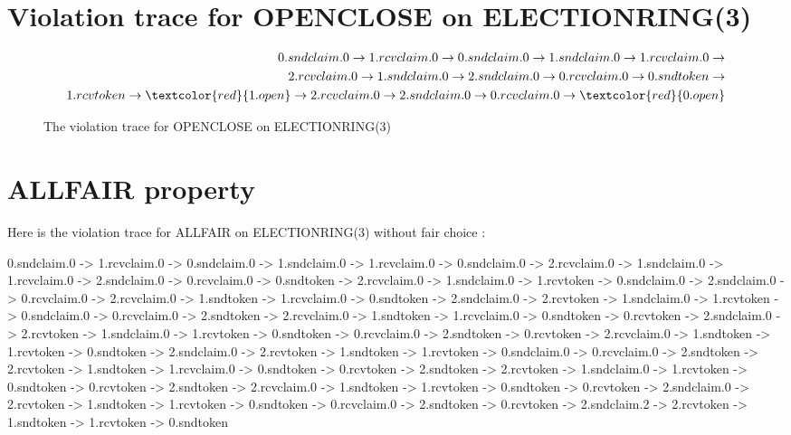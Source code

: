 \documentclass{article}
\begin{document}
\section{Violation trace for OPENCLOSE on ELECTIONRING(3)}

\begin{figure}[h!]
\begin{equation*}
\begin{split}
	0.sndclaim.0 \rightarrow 1.rcvclaim.0 \rightarrow 0.sndclaim.0 \rightarrow 1.sndclaim.0 \rightarrow 1.rcvclaim.0 \rightarrow \\ 2.rcvclaim.0 \rightarrow 1.sndclaim.0 \rightarrow 2.sndclaim.0 \rightarrow 0.rcvclaim.0 \rightarrow 0.sndtoken \rightarrow \\
    1.rcvtoken \rightarrow \textcolor{red}{1.open} \rightarrow 2.rcvclaim.0 \rightarrow 2.sndclaim.0 \rightarrow 0.rcvclaim.0 \rightarrow \textcolor{red}{0.open}
\end{split}
\end{equation*}
\caption{The violation trace for OPENCLOSE on ELECTIONRING(3)}
\end{figure}


\section{ALLFAIR property}

Here is the violation trace for ALLFAIR on ELECTIONRING(3) without fair choice :

\begin{spverbatim}
0.sndclaim.0 -> 1.rcvclaim.0  -> 0.sndclaim.0 -> 1.sndclaim.0 -> 1.rcvclaim.0 -> 0.sndclaim.0 -> 2.rcvclaim.0 -> 1.sndclaim.0 -> 1.rcvclaim.0 -> 2.sndclaim.0 -> 0.rcvclaim.0 -> 0.sndtoken -> 2.rcvclaim.0 -> 1.sndclaim.0 -> 1.rcvtoken -> 0.sndclaim.0 -> 2.sndclaim.0 -> 0.rcvclaim.0 -> 2.rcvclaim.0 -> 1.sndtoken -> 1.rcvclaim.0 -> 0.sndtoken -> 2.sndclaim.0 -> 2.rcvtoken -> 1.sndclaim.0 -> 1.rcvtoken -> 0.sndclaim.0 -> 0.rcvclaim.0 -> 2.sndtoken -> 2.rcvclaim.0 -> 1.sndtoken -> 1.rcvclaim.0 -> 0.sndtoken -> 0.rcvtoken -> 2.sndclaim.0 -> 2.rcvtoken -> 1.sndclaim.0 -> 1.rcvtoken -> 0.sndtoken -> 0.rcvclaim.0 -> 2.sndtoken -> 0.rcvtoken -> 2.rcvclaim.0 -> 1.sndtoken -> 1.rcvtoken -> 0.sndtoken -> 2.sndclaim.0 -> 2.rcvtoken -> 1.sndtoken -> 1.rcvtoken -> 0.sndclaim.0 -> 0.rcvclaim.0 -> 2.sndtoken -> 2.rcvtoken -> 1.sndtoken -> 1.rcvclaim.0 -> 0.sndtoken -> 0.rcvtoken -> 2.sndtoken -> 2.rcvtoken -> 1.sndclaim.0 -> 1.rcvtoken -> 0.sndtoken -> 0.rcvtoken -> 2.sndtoken -> 2.rcvclaim.0 -> 1.sndtoken -> 1.rcvtoken -> 0.sndtoken -> 0.rcvtoken -> 2.sndclaim.0 -> 2.rcvtoken -> 1.sndtoken -> 1.rcvtoken -> 0.sndtoken -> 0.rcvclaim.0 -> 2.sndtoken -> 0.rcvtoken -> 2.sndclaim.2 -> 2.rcvtoken -> 1.sndtoken -> 1.rcvtoken -> 0.sndtoken
\end{spverbatim}
\bigskip
\end{document}

